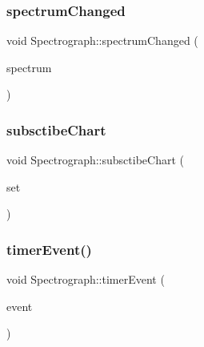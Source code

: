\subsubsection{\texorpdfstring{spectrum\+Changed}{spectrumChanged}}
{\footnotesize\ttfamily void Spectrograph\+::spectrum\+Changed (\begin{DoxyParamCaption}\item[{const \hyperlink{class_frequency_spectrum}{Frequency\+Spectrum} \&}]{spectrum }\end{DoxyParamCaption})\hspace{0.3cm}{\ttfamily [slot]}}

\hypertarget{class_spectrograph_a94b5df4c4d57b03cc588b2ecfc0d9596}{}\label{class_spectrograph_a94b5df4c4d57b03cc588b2ecfc0d9596} 
\subsubsection{\texorpdfstring{subsctibe\+Chart}{subsctibeChart}}
{\footnotesize\ttfamily void Spectrograph\+::subsctibe\+Chart (\begin{DoxyParamCaption}\item[{Q\+X\+Y\+Series $\ast$}]{set }\end{DoxyParamCaption})\hspace{0.3cm}{\ttfamily [slot]}}

\hypertarget{class_spectrograph_a9141c4da693b8c00d4ab8d9b5ba6e670}{}\label{class_spectrograph_a9141c4da693b8c00d4ab8d9b5ba6e670} 
\subsubsection{\texorpdfstring{timer\+Event()}{timerEvent()}}
{\footnotesize\ttfamily void Spectrograph\+::timer\+Event (\begin{DoxyParamCaption}\item[{Q\+Timer\+Event $\ast$}]{event }\end{DoxyParamCaption})}

\hypertarget{class_spectrograph_a6c5811644f0e182a7814027f7d9b702c}{}\label{class_spectrograph_a6c5811644f0e182a7814027f7d9b702c} 
